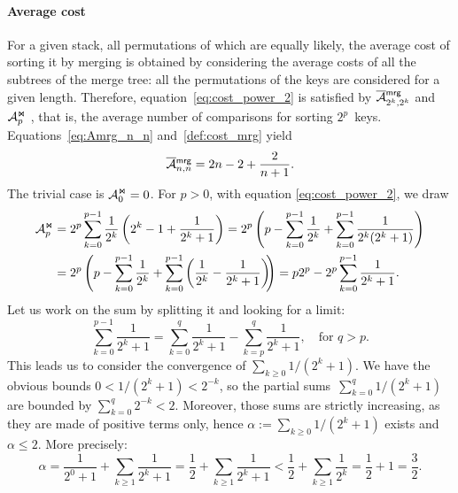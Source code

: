 \paragraph{Average cost}
\label{par:Atms_2p}

For a given stack, all permutations of which are equally likely, the
average cost of sorting it by merging is obtained by considering the
average costs of all the subtrees of the merge tree: all the
permutations of the keys are considered for a given length. Therefore,
equation~\eqref{eq:cost_power_2} is satisfied by
\(\OM{\fun{mrg}}{2^k,2^k}\) and \(\mathcal{A}_{p}^{\Join}\)
, that is, the average number of comparisons
for sorting \(2^p\)~keys. Equations~\eqref{eq:Amrg_n_n}
and~\eqref{def:cost_mrg} yield
\begin{equation*}
\OM{\fun{mrg}}{n,n} = 2n - 2 + \frac{2}{n+1}.
\index{mrg@$\OM{\fun{mrg}}{n,n}$}
\end{equation*}
The trivial case is \(\mathcal{A}_{0}^{\Join} = 0\). For \(p > 0\), with equation
\eqref{eq:cost_power_2}, we draw
\begin{align}
 \mathcal{A}_{p}^{\Join}
  &= 2^p\sum_{k=0}^{p-1}{\frac{1}{2^k}\left(2^k - 1 + \frac{1}{2^k +
      1}\right)}= 2^{p}\left(p - \sum_{k=0}^{p-1}{\frac{1}{2^k}}
     + \sum_{k=0}^{p-1}{\frac{1}{2^k(2^k+1)}}\right)\notag\\
  &= 2^{p}\left(p - \sum_{k=0}^{p-1}{\frac{1}{2^k}}
     + \sum_{k=0}^{p-1}\left(\frac{1}{2^k}
     - \frac{1}{2^k+1}\right)\!\!\right)
     = p2^p - 2^p \sum_{k=0}^{p-1}\frac{1}{2^k+1}.
     \label{eq:Mjoin_temp}
\end{align}
Let us work on the sum by splitting it and looking for a limit:
\begin{equation}
  \sum_{k=0}^{p-1}\frac{1}{2^k+1} = \sum_{k=0}^q\frac{1}{2^k+1} -
  \sum_{k=p}^q\frac{1}{2^k+1}, \quad \text{for \(q > p\)}.
  \label{eq:alpha_conv}
\end{equation}
This leads us to consider the convergence of \(\sum_{k \geqslant
  0}1/(2^k+1)\). We have the obvious bounds \(0 < 1/(2^k+1) < 2^{-k}\), so the
partial sums~\(\sum_{k=0}^q{1/(2^k+1)}\) are bounded by \(\sum_{k=0}^{q}2^{-k} <
2\). Moreover, those sums are strictly increasing, as they are made of positive
terms only, hence \(\alpha := \sum_{k \geqslant 0}1/(2^k+1)\) exists and
\(\alpha \leqslant 2\). More precisely:
\begin{equation*}
  \alpha
  = \frac{1}{2^0+1} + \sum_{k \geqslant 1}\frac{1}{2^k+1}
  = \frac{1}{2} + \sum_{k \geqslant 1}\frac{1}{2^k+1}
  < \frac{1}{2} + \sum_{k \geqslant 1}\frac{1}{2^k}
  = \frac{1}{2} + 1 = \frac{3}{2}.
\end{equation*}
